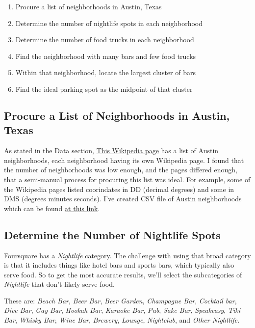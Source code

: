 \documentclass{deagle}
\begin{document}
\begin{enumerate}
	\item Procure a list of neighborhoods in Austin, Texas
	\item Determine the number of nightlife spots in each neighborhood
	\item Determine the number of food trucks in each neighborhood
	\item Find the neighborhood with many bars and few food trucks
	\item Within that neighborhood, locate the largest cluster of bars
	\item Find the ideal parking spot as the midpoint of that cluster
\end{enumerate}

\subsection*{Procure a List of Neighborhoods in Austin, Texas}

As stated in the Data section, \href{https://en.wikipedia.org/wiki/Category:Neighborhoods_in_Austin,_Texas}{This Wikipedia page} has a list of Austin neighborhoods, each neighborhood having its own Wikipedia page. I found that the number of neighborhoods was low enough, and the pages differed enough, that a semi-manual process for procuring this list was ideal. For example, some of the Wikipedia pages listed coorindates in DD (decimal degrees) and some in DMS (degrees minutes seconds). I've created CSV file of Austin neighborhoods which can be found \href{https://github.com/bryandeagle/Coursera_Capstone/raw/main/data/austin.csv}{at this link}.

\subsection*{Determine the Number of Nightlife Spots}

Foursquare has a \emph{Nightlife} category. The challenge with using that broad category is that it includes things like hotel bars and sports bars, which typically also serve food. So to get the most accurate results, we'll select the subcategories of \emph{Nightlife} that don't likely serve food.

These are: \emph{Beach Bar}, \emph{Beer Bar}, \emph{Beer Garden}, \emph{Champagne Bar}, \emph{Cocktail bar}, \emph{Dive Bar}, \emph{Gay Bar}, \emph{Hookah Bar}, \emph{Karaoke Bar}, \emph{Pub}, \emph{Sake Bar}, \emph{Speakeasy}, \emph{Tiki Bar}, \emph{Whisky Bar}, \emph{Wine Bar}, \emph{Brewery}, \emph{Lounge}, \emph{Nightclub}, and \emph{Other Nightlife}.
\end{document}
